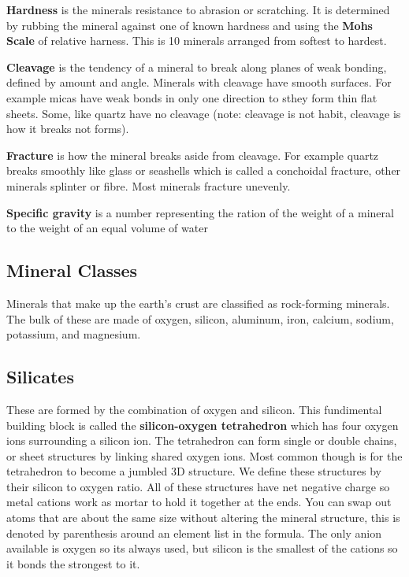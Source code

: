 \documentclass{article}
\begin{document}
\textbf{Hardness} is the minerals resistance to abrasion or scratching. It is determined by rubbing the mineral against one of known hardness and using the \textbf{Mohs Scale} of relative harness. This is 10 minerals arranged from softest to hardest.

\textbf{Cleavage} is the tendency of a mineral to break along planes of weak bonding, defined by amount and angle. Minerals with cleavage have smooth surfaces. For example micas have weak bonds in only one direction to sthey form thin flat sheets. Some, like quartz have no cleavage (note: cleavage is not habit, cleavage is how it breaks not forms).

\textbf{Fracture} is how the mineral breaks aside from cleavage. For example quartz breaks smoothly like glass or seashells which is called a conchoidal fracture, other minerals splinter or fibre. Most minerals fracture unevenly.

\textbf{Specific gravity} is a number representing the ration of the weight of a mineral to the weight of an equal volume of water

\subsection{Mineral Classes} %
\label{sub:mineral_classes}
Minerals that make up the earth's crust are classified as rock-forming minerals. The bulk of these are made of oxygen, silicon, aluminum, iron, calcium, sodium, potassium, and magnesium.

\subsection{Silicates} %
\label{sub:silicates}
These are formed by the combination of oxygen and silicon. This fundimental building block is called the \textbf{silicon-oxygen tetrahedron} which has four oxygen ions surrounding a silicon ion. The tetrahedron can  form single or double chains, or sheet structures by linking shared oxygen ions. Most common though is for the tetrahedron to become a jumbled 3D structure. We define these structures by their silicon to oxygen ratio. All of these structures have net negative charge so metal cations work as mortar to hold it together at the ends. You can swap out atoms that are about the same size without altering the mineral structure, this is denoted by parenthesis around an element list in the formula. The only anion available is oxygen so its always used, but silicon is the smallest of the cations so it bonds the strongest to it.
\end{document}
